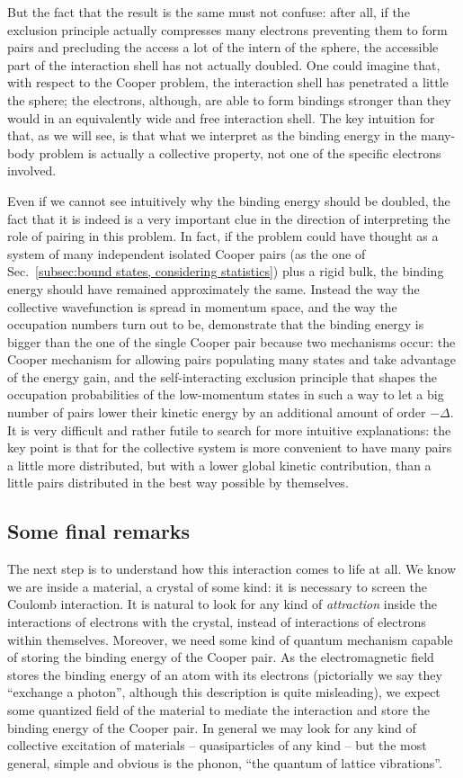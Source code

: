 But the fact that the result is the same must not confuse: after all, if the exclusion principle actually compresses many electrons preventing them to form pairs and precluding the access a lot of the intern of the sphere, the accessible part of the interaction shell has not actually doubled. One could imagine that, with respect to the Cooper problem, the interaction shell has penetrated a little the sphere; the electrons, although, are able to form bindings stronger than they would in an equivalently wide and free interaction shell. The key intuition for that, as we will see, is that what we interpret as the binding energy in the many-body problem is actually a collective property, not one of the specific electrons involved.

Even if we cannot see intuitively why the binding energy should be doubled, the fact that it is indeed is a very important clue in the direction of interpreting the role of pairing in this problem. In fact, if the problem could have thought as a system of many independent isolated Cooper pairs (as the one of Sec.~\ref{subsec:bound states, considering statistics}) plus a rigid bulk, the binding energy should have remained approximately the same. Instead the way the collective wavefunction is spread in momentum space, and the way the occupation numbers turn out to be, demonstrate that the binding energy is bigger than the one of the single Cooper pair because two mechanisms occur: the Cooper mechanism for allowing pairs populating many states and take advantage of the energy gain, and the self-interacting exclusion principle that shapes the occupation probabilities of the low-momentum states in such a way to let a big number of pairs lower their kinetic energy by an additional amount of order $-\Delta$. It is very difficult and rather futile to search for more intuitive explanations: the key point is that for the collective system is more convenient to have many pairs a little more distributed, but with a lower global kinetic contribution, than a little pairs distributed in the best way possible by themselves.

\subsection{Some final remarks}

The next step is to understand how this interaction comes to life at all. We know we are inside a material, a crystal of some kind: it is necessary to screen the Coulomb interaction. It is natural to look for any kind of \textit{attraction} inside the interactions of electrons with the crystal, instead of interactions of electrons within themselves. Moreover, we need some kind of quantum mechanism capable of storing the binding energy of the Cooper pair. As the electromagnetic field stores the binding energy of an atom with its electrons (pictorially we say they ``exchange a photon'', although this description is quite misleading), we expect some quantized field of the material to mediate the interaction and store the binding energy of the Cooper pair. In general we may look for any kind of collective excitation of materials -- quasiparticles of any kind -- but the most general, simple and obvious is the phonon, ``the quantum of lattice vibrations''.

